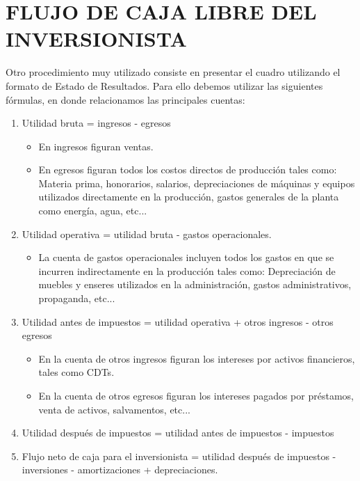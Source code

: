 


\section{FLUJO DE CAJA LIBRE DEL INVERSIONISTA}

Otro procedimiento muy utilizado consiste en presentar el cuadro utilizando el formato de Estado de Resultados. Para ello debemos utilizar las siguientes fórmulas, en donde relacionamos las principales cuentas:

\begin{enumerate}
	\item Utilidad bruta = ingresos - egresos
	      \begin{itemize}
		      \item En ingresos figuran ventas.
		      \item En egresos figuran todos los costos directos de producción tales como: Materia prima, honorarios, salarios, depreciaciones de máquinas y equipos utilizados directamente en la producción, gastos generales de la planta como energía, agua, etc...
	      \end{itemize}
	\item Utilidad operativa = utilidad bruta - gastos operacionales.
	      \begin{itemize}
		      \item La cuenta de gastos operacionales incluyen todos los gastos en que se incurren indirectamente en la producción tales como: Depreciación de muebles y enseres utilizados en la administración, gastos administrativos, propaganda, etc...
	      \end{itemize}
	\item Utilidad antes de impuestos = utilidad operativa + otros ingresos - otros egresos
	      \begin{itemize}
		      \item En la cuenta de otros ingresos figuran los intereses por activos financieros, tales como CDTs.
		      \item En la cuenta de otros egresos figuran los intereses pagados por préstamos, venta de activos, salvamentos, etc...
	      \end{itemize}
	\item Utilidad después de impuestos = utilidad antes de impuestos - impuestos
	      
	\item Flujo neto de caja para el inversionista = utilidad después de impuestos - inversiones - amortizaciones + depreciaciones.
\end{enumerate}

